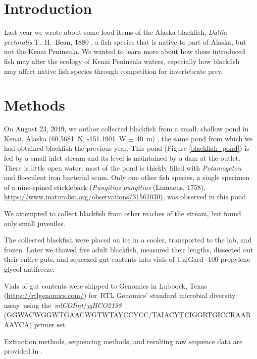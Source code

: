 \begin{multicols}{2}   

\section{Introduction}

Last year we  wrote about some food items of the Alaska blackfish, \textit{Dallia pectoralis} T.\ H.\ Bean, 1880 \citep{Bowseretal2019},  a fish species that is native to part of Alaska, but not the Kenai Peninsula. We wanted to learn more about how these introduced fish may alter the ecology of Kenai Peninsula waters, especially how blackfish may affect native fish species through competition for invertebrate prey.

\section{Methods}

On August 23, 2019, we author collected blackfish from a small, shallow pond in Kenai, Alaska (60.5681~\textdegree{}N, -151.1901~\textdegree{}W $\pm$ 40~m) \citep{bowser2019}, the same pond from which we had obtained blackfish the previous year. This pond (Figure \ref{blackfish_pond}) is fed by a small inlet stream and its level is maintained by a dam at the outlet. There is little open water; most of the pond is thickly filled with \textit{Potamogeton} and flocculent iron bacterial scum. Only one other fish species, a single specimen of a nine-spined stickleback (\textit{Pungitius pungitius} (Linnaeus, 1758),  
\url{https://www.inaturalist.org/observations/31561030}), was observed in this pond.

We attempted to collect blackfish from other reaches of the stream, but found only small juveniles. 

The collected blackfish were placed on ice in a cooler, transported to the lab, and frozen. Later we thawed five adult blackfish, measured their lengths, dissected out their entire guts, and squeezed gut contents into vials of UniGard -100 propylene glycol antifreeze.

Vials of gut contents were shipped to  Genomics in Lubbock, Texas (\url{https://rtlgenomics.com/}) for RTL Genomics' standard microbial diversity assay using the \textit{mlCOIint}/\textit{jgHCO2198} (GGWACWGGWTGAACWGTWTAYCCYCC/TAIACYTCIGGRTGICCRAARAAYCA) primer set.

Extraction methods, sequencing methods, and resulting raw sequence data are provided in \citet{BowserBowser2020}.


\end{multicols}
